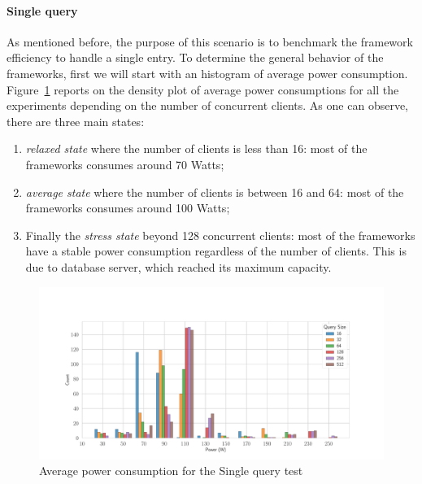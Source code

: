 \paragraph{Single query}
As mentioned before, the purpose of this scenario is to benchmark the framework efficiency to handle a single entry.
To determine the general behavior of the frameworks, first we will start with an histogram of average power consumption.
Figure~\ref{fig:av_power_db} reports on the  density plot of average power consumptions for all the experiments depending on the number of concurrent clients.
As one can observe, there are three main states:
\begin{enumerate}
    \item \emph{relaxed state} where the number of clients is less than 16: most of the frameworks consumes around 70 Watts;
    \item \emph{average state} where the number of clients is between 16 and 64: most of the frameworks consumes around 100 Watts;
    \item Finally the \emph{stress state} beyond 128 concurrent clients: most of the frameworks  have a stable power consumption regardless of the number of clients.
    This is due to database server, which reached its maximum capacity.
\end{enumerate}

\begin{figure}[hbt]
    \centering
    \includegraphics[width=\textwidth,height=\textheight,keepaspectratio]{imgs/histogram_av_power_cpu_db}
    \caption{Average power consumption for the Single query test }
    \label{fig:av_power_db}
\end{figure}

